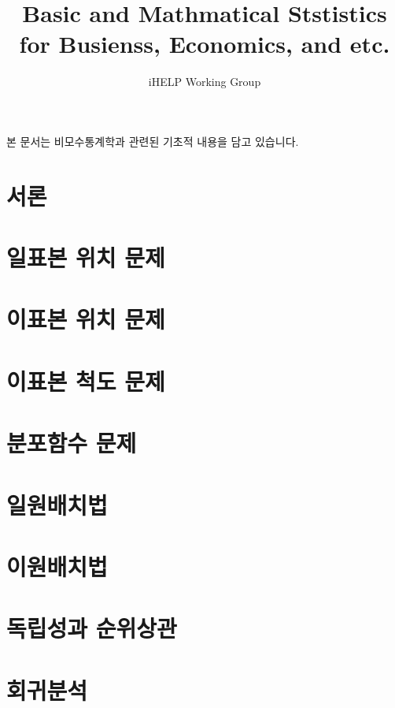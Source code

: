 \documentclass{article}
\begin{document}
\title{Basic and Mathmatical Ststistics for Busienss, Economics, and etc.}
\author{iHELP Working Group}

본 문서는 비모수통계학과 관련된 기초적 내용을 담고 있습니다.

\chapter{서론}


\chapter{일표본 위치 문제}

\chapter{이표본 위치 문제}

\chapter{이표본 척도 문제}

\chapter{분포함수 문제}

\chapter{일원배치법}

\chapter{이원배치법}

\chapter{독립성과 순위상관}

\chapter{회귀분석}
\end{document}
